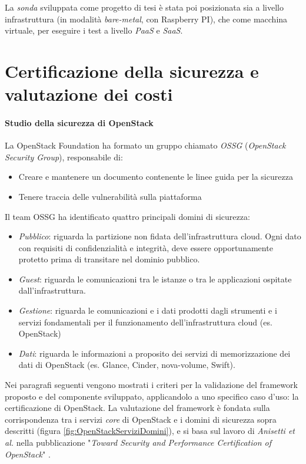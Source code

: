 \documentclass[../main.tex]{subfiles}
\begin{document}
La \textit{sonda} sviluppata come progetto di tesi è stata poi posizionata sia a livello infrastruttura (in modalità \textit{bare-metal}, con Raspberry PI), che come macchina virtuale, per eseguire i test a livello \textit{PaaS} e \textit{SaaS}.
\section{Certificazione della sicurezza e valutazione dei costi}
\paragraph{Studio della sicurezza di OpenStack}
La OpenStack Foundation ha formato un gruppo chiamato \textit{OSSG} (\textit{OpenStack Security Group}), responsabile di:
\begin{itemize}
\item Creare e mantenere un documento contenente le linee guida per la sicurezza \cite{OpenStackSecurity}
\item Tenere traccia delle vulnerabilità sulla piattaforma
\end{itemize}
Il team OSSG ha identificato quattro principali domini di sicurezza:
\begin{itemize}
\item \textit{Pubblico}: riguarda la partizione non fidata dell'infrastruttura cloud. Ogni dato  con requisiti di confidenzialità e integrità, deve essere opportunamente protetto prima di transitare nel dominio pubblico.
\item \textit{Guest}: riguarda le comunicazioni tra le istanze o tra le applicazioni ospitate dall'infrastruttura.
\item \textit{Gestione}: riguarda le comunicazioni e i dati  prodotti dagli strumenti e i servizi fondamentali per il funzionamento dell'infrastruttura cloud (es. OpenStack)
\item \textit{Dati}: riguarda le informazioni a proposito dei servizi di memorizzazione dei dati di OpenStack (es. Glance, Cinder, nova-volume, Swift).
\end{itemize}
Nei paragrafi seguenti vengono mostrati i criteri per la validazione del framework proposto e del componente sviluppato, applicandolo a uno specifico caso d'uso: la certificazione di OpenStack.
La valutazione del framework è fondata sulla corrispondenza tra i servizi \textit{core} di OpenStack e i domini di sicurezza sopra descritti (figura \ref{fig:OpenStackServiziDomini}), e si basa sul lavoro di \textit{Anisetti et al.} nella pubblicazione "\textit{Toward Security and Performance Certification of OpenStack}" \cite{CertOpenstack}.
\end{document}
